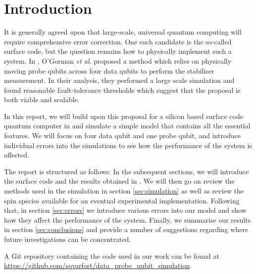\section{Introduction} \label{sec:introduction}

It is generally agreed upon that large-scale, universal quantum computing will require comprehensive error correction. One such candidate is the so-called surface code, but the question remains how to physically implement such a system. In \cite{OGorman2016}, O'Gorman \textit{et al}. proposed a method which relies on physically moving probe qubits across four data qubits to perform the stabiliser measurement. In their analysis, they performed a large scale simulation and found reasonable fault-tolerance thresholds which suggest that the proposal is both viable and scalable. 

In this report, we will build upon this proposal for a silicon based surface code quantum computer in  \cite{OGorman2016} and simulate a simple model that contains all the essential features. We will focus on four data qubit and one probe qubit, and introduce individual errors into the simulations to see how the performance of the system is affected. 

The report is structured as follows: In the subsequent sections, we will introduce the surface code and the results obtained in \citet{OGorman2016}. We will then go on review the methods used in the simulation in section \@ \ref{sec:simulation} as well as review the spin species available for an eventual experimental implementation. Following that, in section \@ \ref{sec:errors} we introduce various errors into our model and show how they affect the performance of the system. Finally, we summarise our results in section \@ \ref{sec:conclusions} and provide a number of suggestions regarding where future investigations can be concentrated. 

A Git repository containing the code used in our work can be found at \url{https://github.com/sqvarfort/data_probe_qubit_simulation}. 

